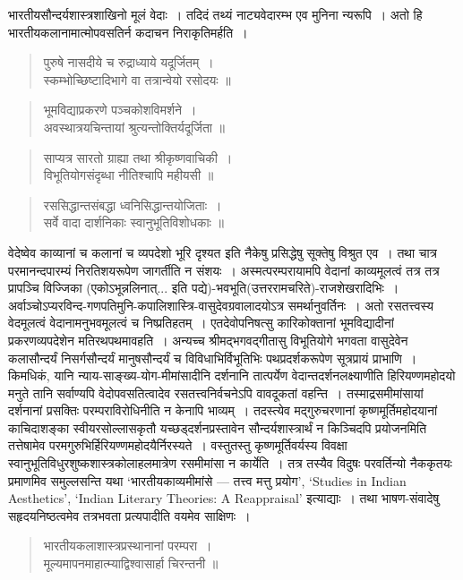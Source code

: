 {\dev भारतीयसौन्दर्यशास्त्रशाखिनो मूलं वेदाः~। तदिदं तथ्यं नाट्यवेदारम्भ एव मुनिना न्यरूपि~। अतो हि भारतीयकलानामात्मोपवसतिर्न कदाचन निराकृतिमर्हति~।}
\begin{quote}
{\dev पुरुषे नासदीये च रुद्राध्याये यदूर्जितम्~।}\\
{\dev स्कम्भोच्छिष्टादिभागे वा तत्रान्वेयो रसोदयः ॥}
\end{quote}
\begin{quote}
{\dev भूमविद्याप्रकरणे पञ्चकोशविमर्शने~।}\\
{\dev अवस्थात्रयचिन्तायां श्रुत्यन्तोक्तिर्यदूर्जिता ॥}
\end{quote}
\begin{quote}
{\dev साप्यत्र सारतो ग्राह्या तथा श्रीकृष्णवाचिकी~।}\\
{\dev विभूतियोगसंदृब्धा नीतिश्चापि महीयसी ॥}
\end{quote}
\begin{quote}
{\dev रससिद्धान्तसंबद्धा ध्वनिसिद्धान्तयोजिताः~।}\\
{\dev सर्वे वादा दार्शनिकाः स्वानुभूतिविशोधकाः ॥}
\end{quote}

{\dev वेदेष्वेव काव्यानां च कलानां च व्यपदेशो भूरि दृश्यत इति नैकेषु प्रसिद्धेषु सूक्तेषु विश्रुत एव~। तथा चात्र परमानन्दपारम्यं निरतिशयरूपेण जागर्तीति न संशयः~। अस्मत्परम्परायामपि वेदानां काव्यमूलत्वं तत्र तत्र प्रापञ्चि विज्जिका (एकोऽभून्नलिनात्... इति पद्ये)-भवभूति(उत्तर\-रामचरिते)-राजशेखरादिभिः~। अर्वाञ्चोऽप्यरविन्द-गणपतिमुनि-कपालिशास्त्रि-वासुदेव\-\-ग्रवालादयोऽत्र समर्थानुवर्तिनः~। अतो रसतत्त्वस्य वेदमूलत्वं वेदानामनुभवमूलत्वं च निष्प्रतिहतम्~।  एतदेवोपनिषत्सु कारिकोक्तानां भूमविद्यादीनां प्रकरणव्यपदेशेन मतिरथपथ\-मावहति~। अन्यच्च श्रीमद्भगवद्गीतासु विभूतियोगे भगवता वासुदेवेन कलासौन्दर्यं निसर्ग\-सौन्दर्यं मानुषसौन्दर्यं च विविधाभिर्विभूतिभिः पथप्रदर्शकरूपेण सूत्रप्रायं प्राभाणि~। किमधिकं, यानि न्याय-साङ्ख्य-योग-मीमांसादीनि दर्शनानि तात्पर्येण वेदान्तदर्शनलक्ष्याणीति हिरियण्ण\-महोदयो मनुते तानि सर्वाण्यपि वेदोपवसतित्वादेव रसतत्त्वनिर्वचनेऽपि वावदूकतां वहन्ति~। तस्माद्रसमीमांसायां दर्शनानां प्रसक्तिः परम्पराविरोधिनीति न केनापि भाव्यम्~। तदस्त्येव मद्गुरुचरणानां कृष्णमूर्तिमहोदयानां काचिदाशङ्का स्वीयरसोल्लासकृतौ यच्छड्दर्शनप्रस्तावेन सौन्दर्यशास्त्रार्थं न किञ्चिदपि प्रयोजनमिति तत्तेषामेव परमगुरुभिर्हिरियण्णमहोदयैर्निरस्यते~। वस्तुतस्तु कृष्णमूर्तिवर्यस्य विवक्षा स्वानुभूतिविधुरशुष्कशास्त्रकोलाहलमात्रेण रसमीमांसा न कार्येति~। तत्र तस्यैव विदुषः परवर्तिन्यो नैककृतयः प्रमाणमिव समुल्लसन्ति यथा ‘भारतीय\-काव्यमीमांसे --- तत्त्व मत्तु प्रयोग’,} `Studies in Indian Aesthetics', `Indian Literary Theories: A Reappraisal' {\dev इत्याद्याः~। तथा भाषण-संवादेषु सहृदयनिष्ठत्वमेव तत्रभवता प्रत्यपादीति वयमेव साक्षिणः~।}
\begin{quote}
{\dev भारतीयकलाशास्त्रप्रस्थानानां परम्परा~।}\\
{\dev मूल्यमापनमाहात्म्याद्विश्वासार्हा चिरन्तनी ॥}
\end{quote}

